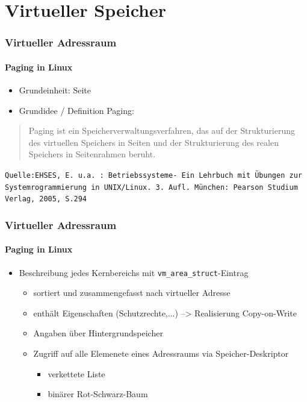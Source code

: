\documentclass[ddcfooter,nosectionnum]{tudbeamer}
\begin{document}
\section{Virtueller Speicher}
\begin{frame}
    \frametitle{Virtueller Adressraum}
    \framesubtitle {Paging in Linux}
    \begin{itemize}
         \item  Grundeinheit: Seite
         \item Grundidee / Definition Paging: 
          \end{itemize}
        \begin{quote}
          	\glqq Paging ist ein Speicherverwaltungsverfahren, das auf der Strukturierung  des virtuellen Speichers 	in Seiten und der Strukturierung des realen Speichers in Seitenrahmen beruht.\grqq
         \end{quote}
         \texttt{\tiny Quelle:EHSES, E. u.a. : Betriebssysteme- Ein Lehrbuch mit Übungen zur Systemrogrammierung in UNIX/Linux. 3. Aufl. München: Pearson Studium Verlag, 2005, S.294}
	    
\end{frame}


\begin{frame}
    \frametitle{Virtueller Adressraum}
    \framesubtitle {Paging in Linux}
    \begin{itemize}
    	    \item Beschreibung jedes Kernbereichs mit \texttt{vm\_area\_struct}-Eintrag 
   		\begin{itemize}
			 \item sortiert und zusammengefasst nach virtueller Adresse\\
			\item enthält Eigenschaften (Schutzrechte,...)
			--> Realisierung Copy-on-Write
			\item Angaben über Hintergrundspeicher
    			\item Zugriff auf alle Elemenete eines Adressraums via Speicher-Deskriptor
			\begin{itemize}
				\item verkettete Liste
				\item binärer Rot-Schwarz-Baum
			\end{itemize}
   		\end{itemize} 
	\end{itemize}
    
\end{frame}
\end{document}
